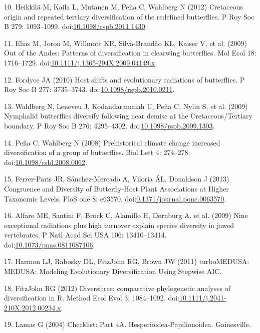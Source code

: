 \documentclass[10pt]{article}
\begin{document}
10. Heikkilä M, Kaila L, Mutanen M, Peña C, Wahlberg N (2012) Cretaceous
origin and repeated tertiary diversification of the redefined
butterflies. P Roy Soc B 279: 1093--1099.
doi:\href{http://dx.doi.org/10.1098/rspb.2011.1430}{10.1098/rspb.2011.1430}.

11. Elias M, Joron M, Willmott KR, Silva-Brandão KL, Kaiser V, et al.
(2009) Out of the Andes: Patterns of diversification in clearwing
butterflies. Mol Ecol 18: 1716--1729.
doi:\href{http://dx.doi.org/10.1111/j.1365-294X.2009.04149.x}{10.1111/j.1365-294X.2009.04149.x}.

12. Fordyce JA (2010) Host shifts and evolutionary radiations of
butterflies. P Roy Soc B 277: 3735--3743.
doi:\href{http://dx.doi.org/10.1098/rspb.2010.0211}{10.1098/rspb.2010.0211}.

13. Wahlberg N, Leneveu J, Kodandaramaiah U, Peña C, Nylin S, et al.
(2009) Nymphalid butterflies diversify following near demise at the
Cretaceous/Tertiary boundary. P Roy Soc B 276: 4295--4302.
doi:\href{http://dx.doi.org/10.1098/rspb.2009.1303}{10.1098/rspb.2009.1303}.

14. Pe\~na C, Wahlberg N (2008) Prehistorical climate change increased
diversification of a group of butterflies. Biol Lett 4: 274--278.
doi:\href{http://dx.doi.org/10.1098/rsbl.2008.0062}{10.1098/rsbl.2008.0062}.

15. Ferrer-Paris JR, S{á}nchez-Mercado A, Viloria ÁL, Donaldson J (2013)
Congruence and Diversity of Butterfly-Host Plant Associations at Higher
Taxonomic Levels. PloS one 8: e63570.
doi:\href{http://dx.doi.org/0.1371/journal.pone.0063570}{0.1371/journal.pone.0063570}.

16. Alfaro ME, Santini F, Brock C, Alamillo H, Dornburg A, et al. (2009)
Nine exceptional radiations plus high turnover explain species diversity
in jawed vertebrates. P Natl Acad Sci USA 106: 13410--13414.
doi:\href{http://dx.doi.org/10.1073/pnas.0811087106}{10.1073/pnas.0811087106}.

17. Harmon LJ, Rabosky DL, {FitzJohn} RG, Brown JW (2011) turboMEDUSA:
MEDUSA: Modeling Evolutionary Diversification Using Stepwise AIC.

18. {FitzJohn} RG (2012) Diversitree: comparative phylogenetic analyses
of diversification in R. Method Ecol Evol 3: 1084--1092.
doi:\href{http://dx.doi.org/10.1111/j.2041-210X.2012.00234.x}{10.1111/j.2041-210X.2012.00234.x}.

19. Lamas G (2004) Checklist: Part 4A. Hesperioidea-Papilionoidea.
Gainesville.
\end{document}
